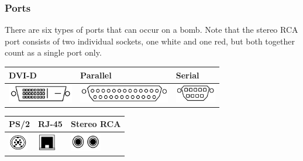 \documentclass{../../ktane-mod}
\begin{document}
\subsubsection*{Ports}
There are six types of ports that can occur on a bomb.
Note that the stereo RCA port consists of two individual sockets, one white and one red, but both together count as a single port only.
\begin{table}[h]
  \centering
  \begin{tabular}{|
      >{\centering\arraybackslash}p{} |
      >{\centering\arraybackslash}p{} |
      >{\centering\arraybackslash}p{} |}
    \hline
    \cellcolor{lightgray} DVI-D &
    \cellcolor{lightgray} Parallel &
    \cellcolor{lightgray} Serial \\ \hline
    \vspace{0cm}
    \includegraphics[height=0.8cm]{images/ew_dvi-d} &
    \vspace{0cm}
    \includegraphics[height=0.8cm]{images/ew_parallel} &
    \vspace{0cm}
    \includegraphics[height=0.8cm]{images/ew_serial} \\ \hline
  \end{tabular}
\end{table}
\begin{table}[h]
  \centering
  \begin{tabular}{|
      >{\centering\arraybackslash}p{} |
      >{\centering\arraybackslash}p{} |
      >{\centering\arraybackslash}p{} |}
    \hline
    \cellcolor{lightgray} PS/2 &
    \cellcolor{lightgray} RJ-45 &
    \cellcolor{lightgray} Stereo RCA \\ \hline
    \vspace{0cm}
    \includegraphics[height=0.8cm]{images/ew_ps2} &
    \vspace{0cm}
    \includegraphics[height=0.8cm]{images/ew_rj-45} &
    \vspace{0cm}
    \includegraphics[height=0.8cm]{images/ew_stereo} \\ \hline
  \end{tabular}
\end{table}

\clearpage
\end{document}
